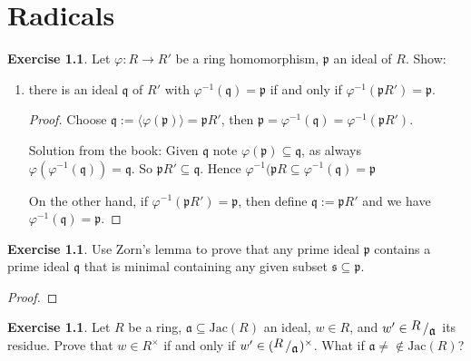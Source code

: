 \documentclass{book}
\theoremstyle{plain}
\theoremstyle{definition}
\newtheorem{exr}[thm]{Exercise}
\theoremstyle{custom_definition}
\newcommand{\bigslant}[2]{{\raisebox{.2em}{$#1$}\left/\raisebox{-.2em}{$#2$}\right.}}
\begin{document}
\chapter{Radicals}

\begin{exr}%
  Let \(\varphi: R \longrightarrow R'\) be a ring homomorphism, \(\mathfrak{p}\) an ideal of \(R\). Show:
  \begin{enumerate}
    \item there is an ideal \(\mathfrak{q}\) of \(R'\) with \(\varphi^{-1}(\mathfrak{q}) = \mathfrak{p}\) if and only if \(\varphi^{-1}(\mathfrak{p}R') = \mathfrak{p}\).
    \begin{proof}
      Choose \(\mathfrak{q} := \langle \varphi(\mathfrak{p}) \rangle = \mathfrak{p}R'\), then \(\mathfrak{p} = \varphi^{-1}(\mathfrak{q}) = \varphi^{-1}(\mathfrak{p}R')\).

      Solution from the book: Given \(\mathfrak{q}\) note \(\varphi(\mathfrak{p}) \subseteq \mathfrak{q}\), as always \(\varphi(\varphi^{-1} (\mathfrak{q})) = \mathfrak{q}\). So \(\mathfrak{p}R' \subseteq \mathfrak{q}\). Hence \(\varphi^{-1}(\mathfrak{p}R \subseteq \varphi^{-1}(\mathfrak{q}) = \mathfrak{p}\)

      On the other hand, if \(\varphi^{-1}(\mathfrak{p}R') = \mathfrak{p}\), then define \(\mathfrak{q} := \mathfrak{p}R'\) and we have \(\varphi^{-1}(\mathfrak{q}) = \mathfrak{p}\).
    \end{proof}
  \end{enumerate}
\end{exr}

\begin{exr}
  Use Zorn's lemma to prove that any prime ideal \(\mathfrak{p}\) contains a prime ideal \(\mathfrak{q}\) that is minimal containing any given subset \(\mathfrak{s} \subseteq \mathfrak{p}\).
\end{exr}

\begin{proof}
  
\end{proof}

\begin{exr}
  Let \(R\) be a ring, \(\mathfrak{a} \subseteq \text{Jac}(R)\) an ideal, \(w \in R\), and \(w' \in \bigslant{R}{\mathfrak{a}}\) its residue. Prove that \(w \in R^\times\) if and only if \(w' \in (\bigslant{R}{\mathfrak{a}})^\times\). What if \(\mathfrak{a} \neq \notin \text{Jac}(R)\)?
\end{exr}
\end{document}
